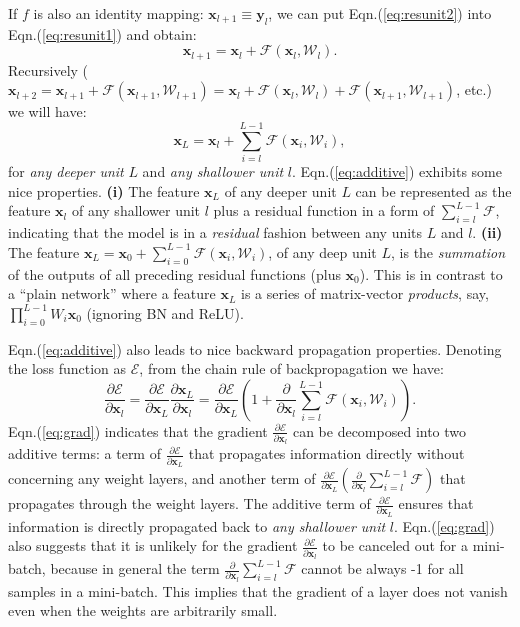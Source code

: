\documentclass[runningheads]{llncs}
\newcommand{\ve}[1]{\mathbf{#1}} \newcommand{\ma}[1]{\mathrm{#1}}
\newcommand{\fp}[2]{\frac{\partial{#1}}{\partial{#2}}} \newcommand{\dvp}[2]{\frac{\partial}{\partial{#2}}#1}
\begin{document}
If $f$ is also an identity mapping: $\ve{x}_{l+1} \equiv \ve{y}_{l}$, we can put Eqn.(\ref{eq:resunit2}) into Eqn.(\ref{eq:resunit1}) and obtain:
\begin{equation}
\ve{x}_{l+1} = \ve{x}_{l} + \mathcal{F}(\ve{x}_{l}, \mathcal{W}_{l}). \label{eq:additive0}
\end{equation}
Recursively ({\fontsize{8pt}{1em}$\ve{x}_{l+2} = \ve{x}_{l+1} + \mathcal{F}(\ve{x}_{l+1},\mathcal{W}_{l+1})=\ve{x}_{l} + \mathcal{F}(\ve{x}_{l}, \mathcal{W}_{l})+\mathcal{F}(\ve{x}_{l+1}, \mathcal{W}_{l+1})$}, etc.) we will have:
\begin{equation}
\ve{x}_{L} = \ve{x}_{l} + \sum_{i=l}^{L-1}\mathcal{F}(\ve{x}_{i}, \mathcal{W}_{i}), \label{eq:additive}
\end{equation}
for \emph{any deeper unit} $L$ and \emph{any shallower unit} $l$. Eqn.(\ref{eq:additive}) exhibits some nice properties. \textbf{(i)} The feature $\ve{x}_L$ of any deeper unit $L$ can be represented as the feature $\ve{x}_l$ of any shallower unit $l$ plus a residual function in a form of $\sum_{i=l}^{L-1}\mathcal{F}$, indicating that the model is in a \emph{residual} fashion between any units $L$ and $l$. \textbf{(ii)} The feature $\ve{x}_{L} = \ve{x}_{0} + \sum_{i=0}^{L-1}\mathcal{F}(\ve{x}_{i}, \mathcal{W}_{i})$, of any deep unit $L$,  is the \emph{summation} of the outputs of all preceding residual functions (plus $\ve{x}_{0}$). This is in contrast to a ``plain network'' where a feature $\ve{x}_{L}$ is a series of matrix-vector \emph{products}, say, $\prod_{i=0}^{L-1}W_{i}\ve{x}_0$ (ignoring BN and ReLU).

Eqn.(\ref{eq:additive}) also leads to nice backward propagation properties.
Denoting the loss function as $\mathcal{E}$, from the chain rule of backpropagation \cite{LeCun1989} we have:
\begin{equation}
\fp{\mathcal{E}}{\ve{x}_{l}}=\fp{\mathcal{E}}{\ve{x}_{L}}\fp{\ve{x}_{L}}{\ve{x}_{l}}=\fp{\mathcal{E}}{\ve{x}_{L}}\left(1+\dvp{\sum_{i=l}^{L-1}\mathcal{F}(\ve{x}_{i}, \mathcal{W}_{i})}{\ve{x}_{l}}\right).\label{eq:grad}
\end{equation}
Eqn.(\ref{eq:grad}) indicates that the gradient $\fp{\mathcal{E}}{\ve{x}_{l}}$ can be decomposed into two additive terms: a term of $\fp{\mathcal{E}}{\ve{x}_{L}}$ that propagates information directly without concerning any weight layers, and another term of {\fontsize{8pt}{1em}\selectfont $\fp{\mathcal{E}}{\ve{x}_{L}}\left(\dvp{\sum_{i=l}^{L-1}\mathcal{F}}{\ve{x}_{l}}\right)$} that propagates through the weight layers. The additive term of $\fp{\mathcal{E}}{\ve{x}_{L}}$ ensures that information is directly propagated back to \emph{any shallower unit} $l$.
Eqn.(\ref{eq:grad}) also suggests that it is unlikely for the gradient $\fp{\mathcal{E}}{\ve{x}_{l}}$ to be canceled out for a mini-batch, because in general the term {\fontsize{8pt}{1em}\selectfont $\dvp{\sum_{i=l}^{L-1}\mathcal{F}}{\ve{x}_{l}}$} cannot be always -1 for all samples in a mini-batch. This implies that the gradient of a layer does not vanish even when the weights are arbitrarily small.
\end{document}
